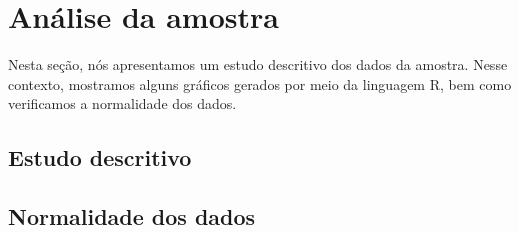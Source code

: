 \section{An\'alise da amostra}
\label{sec:analise}

Nesta seção, nós apresentamos um estudo descritivo dos dados da amostra. Nesse contexto, mostramos alguns gráficos gerados por meio da linguagem R, bem como verificamos a normalidade dos dados.

\subsection{Estudo descritivo}
\label{sec:estudo}


\subsection{Normalidade dos dados}
\label{sec:normalidade}

